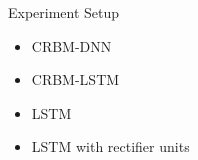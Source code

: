 	
	\begin{frame}[t]{Experiment Setup}
		\begin{minipage}[t]{\linewidth}
		\begin{itemize}[<+->]
		  \item<only@1> CRBM-DNN 
		  \item<only@2> CRBM-LSTM
		  \item<only@3> LSTM
		  \item<only@4> LSTM with rectifier units
		\end{itemize}
		\end{minipage}\hspace{5mm}
		
		\begin{minipage}[t]{\linewidth}
		    \begin{figure}[b]

\end{figure}
\end{minipage}
\end{frame}
